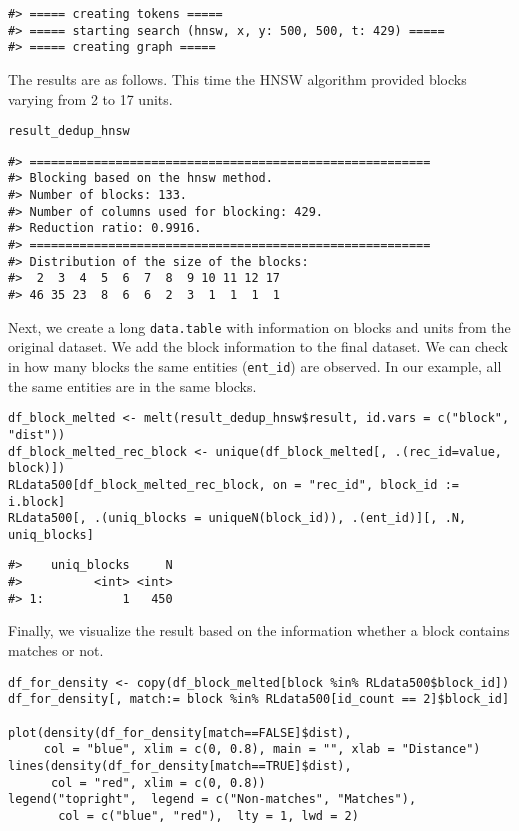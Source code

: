\begin{verbatim}
#> ===== creating tokens =====
#> ===== starting search (hnsw, x, y: 500, 500, t: 429) =====
#> ===== creating graph =====
\end{verbatim}

The results are as follows. This time the HNSW algorithm provided blocks varying from 2 to 17 units.

\begin{verbatim}
result_dedup_hnsw
\end{verbatim}

\begin{verbatim}
#> ========================================================
#> Blocking based on the hnsw method.
#> Number of blocks: 133.
#> Number of columns used for blocking: 429.
#> Reduction ratio: 0.9916.
#> ========================================================
#> Distribution of the size of the blocks:
#>  2  3  4  5  6  7  8  9 10 11 12 17 
#> 46 35 23  8  6  6  2  3  1  1  1  1
\end{verbatim}

Next, we create a long \texttt{data.table} with information on blocks and units from
the original dataset. We add the block information to the final dataset.
We can check in how many blocks the same entities (\texttt{ent\_id}) are
observed. In our example, all the same entities are in the same blocks.

\begin{verbatim}
df_block_melted <- melt(result_dedup_hnsw$result, id.vars = c("block", "dist"))
df_block_melted_rec_block <- unique(df_block_melted[, .(rec_id=value, block)])
RLdata500[df_block_melted_rec_block, on = "rec_id", block_id := i.block]
RLdata500[, .(uniq_blocks = uniqueN(block_id)), .(ent_id)][, .N, uniq_blocks]
\end{verbatim}

\begin{verbatim}
#>    uniq_blocks     N
#>          <int> <int>
#> 1:           1   450
\end{verbatim}

Finally, we visualize the result based on the information whether a
block contains matches or not.

\begin{verbatim}
df_for_density <- copy(df_block_melted[block %in% RLdata500$block_id])
df_for_density[, match:= block %in% RLdata500[id_count == 2]$block_id]

plot(density(df_for_density[match==FALSE]$dist),
     col = "blue", xlim = c(0, 0.8), main = "", xlab = "Distance")
lines(density(df_for_density[match==TRUE]$dist),
      col = "red", xlim = c(0, 0.8))
legend("topright",  legend = c("Non-matches", "Matches"), 
       col = c("blue", "red"),  lty = 1, lwd = 2)
\end{verbatim}

